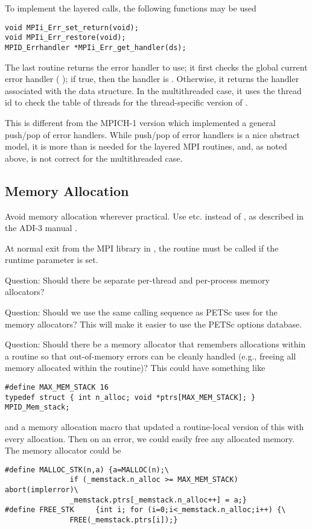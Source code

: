 \documentclass{article}
\begin{document}
To implement the layered calls, the following functions may be 
used 
\begin{verbatim}
void MPIi_Err_set_return(void);
void MPIi_Err_restore(void);
MPID_Errhandler *MPIi_Err_get_handler(ds);
\end{verbatim}
The last routine returns the error handler to use; it first checks the
global current error handler (
); if true, then the handler is
.  Otherwise, it returns the handler
associated with the data structure.  In the multithreaded case, it
uses the thread id to check the table of threads for the
thread-specific version of .

This is different from the MPICH-1 version which implemented a general
push/pop of error handlers.  While push/pop of error handlers is a
nice abstract model, it is more than is needed for the layered MPI
routines, and, as noted above, is not correct for the multithreaded
case.

\subsection{Memory Allocation}
Avoid memory allocation wherever practical.  Use 
etc. instead of , as described in the ADI-3 manual
\cite{adi3man}. 

At normal exit from the MPI library in , the
routine  must be called if the runtime parameter
 is set.  

Question: Should there be separate per-thread and per-process memory
allocators? 

Question: Should we use the same calling sequence as PETSc uses for the memory
allocators?  This will make it easier to use the PETSc options database.

Question: Should there be a memory allocator that remembers allocations within
a routine so that out-of-memory errors can be cleanly handled (e.g., freeing
all memory allocated within the routine)?  This could have something like
\begin{verbatim}
#define MAX_MEM_STACK 16
typedef struct { int n_alloc; void *ptrs[MAX_MEM_STACK]; } MPID_Mem_stack;
\end{verbatim}
and a memory allocation macro that updated a routine-local version of this
with every allocation.  Then on an error, we could easily free any allocated
memory.  The memory allocator could be
\begin{verbatim}
#define MALLOC_STK(n,a) {a=MALLOC(n);\
               if (_memstack.n_alloc >= MAX_MEM_STACK) abort(implerror)\
               _memstack.ptrs[_memstack.n_alloc++] = a;}
#define FREE_STK     {int i; for (i=0;i<_memstack.n_alloc;i++) {\
               FREE(_memstack.ptrs[i]);}
\end{verbatim}
\end{document}
